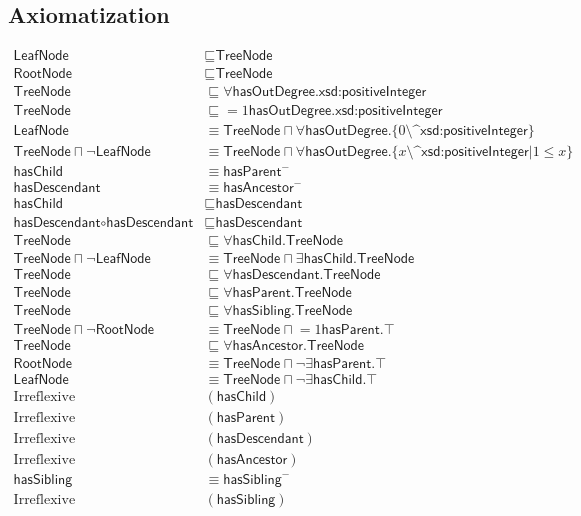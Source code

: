 \subsection{Axiomatization}
\label{axs:Tree}
\begin{align}
\textsf{LeafNode} &\sqsubseteq \textsf{TreeNode} \\ 
\textsf{RootNode} &\sqsubseteq \textsf{TreeNode} \\ 
\textsf{TreeNode} &\sqsubseteq \forall \textsf{hasOutDegree.xsd:positiveInteger} \\ 
\textsf{TreeNode} &\sqsubseteq \mathord{=1}\textsf{hasOutDegree.xsd:positiveInteger} \\ 
\textsf{LeafNode} &\equiv \textsf{TreeNode} \sqcap \forall \textsf{hasOutDegree.} \{ 0 \textsf{\^{}\^{}xsd:positiveInteger}\} \\ 
\textsf{TreeNode} \sqcap \lnot \textsf{LeafNode} &\equiv \textsf{TreeNode} \sqcap \forall \textsf{hasOutDegree.}\{ x\textsf{\^{}\^{}xsd:positiveInteger} | 1 \leq x\} \\
\textsf{hasChild} &\equiv \textsf{hasParent}^- \\ 
\textsf{hasDescendant} &\equiv \textsf{hasAncestor}^- \\ 
\textsf{hasChild} &\sqsubseteq \textsf{hasDescendant} \\ 
\textsf{hasDescendant} \circ \textsf{hasDescendant} &\sqsubseteq \textsf{hasDescendant} \\ 
\textsf{TreeNode} &\sqsubseteq \forall \textsf{hasChild.TreeNode} \\ 
\textsf{TreeNode} \sqcap \lnot \textsf{LeafNode} &\equiv \textsf{TreeNode} \sqcap \exists \textsf{hasChild.TreeNode} \\ 
\textsf{TreeNode} &\sqsubseteq \forall \textsf{hasDescendant.TreeNode} \\ 
\textsf{TreeNode} &\sqsubseteq \forall \textsf{hasParent.TreeNode} \\ 
\textsf{TreeNode} &\sqsubseteq \forall \textsf{hasSibling.TreeNode} \\ 
\textsf{TreeNode} \sqcap \lnot \textsf{RootNode} &\equiv \textsf{TreeNode} \sqcap \mathord{=1}\textsf{hasParent.}\top \\ 
\textsf{TreeNode} &\sqsubseteq \forall \textsf{hasAncestor.TreeNode} \\ 
\textsf{RootNode} &\equiv \textsf{TreeNode} \sqcap \lnot\exists \textsf{hasParent.}\top \\ 
\textsf{LeafNode} &\equiv \textsf{TreeNode} \sqcap \lnot\exists \textsf{hasChild.}\top \\ 
\text{Irreflexive}&(\textsf{hasChild}) \\ 
\text{Irreflexive}&(\textsf{hasParent}) \\ 
\text{Irreflexive}&(\textsf{hasDescendant}) \\ 
\text{Irreflexive}&(\textsf{hasAncestor}) \\ 
\textsf{hasSibling} &\equiv \textsf{hasSibling}^- \\ 
\text{Irreflexive}&(\textsf{hasSibling})
\end{align}

